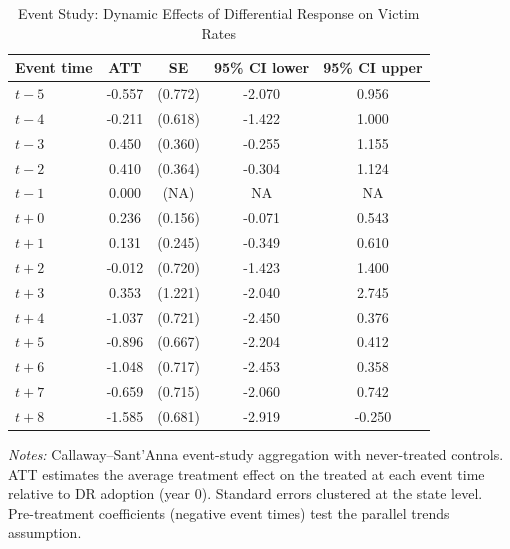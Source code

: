 \begin{table}[htbp]
\centering
\begin{threeparttable}
\caption{Event Study: Dynamic Effects of Differential Response on Victim Rates}
\label{tab:event_study}
\small
\begin{tabular}{lcccc}
\toprule
Event time & ATT & SE & 95\% CI lower & 95\% CI upper \\
\midrule
$t-5$ & -0.557 & (0.772) & -2.070 & 0.956 \\
$t-4$ & -0.211 & (0.618) & -1.422 & 1.000 \\
$t-3$ & 0.450 & (0.360) & -0.255 & 1.155 \\
$t-2$ & 0.410 & (0.364) & -0.304 & 1.124 \\
$t-1$ & 0.000 & (NA) & NA & NA \\
$t+0$ & 0.236 & (0.156) & -0.071 & 0.543 \\
$t+1$ & 0.131 & (0.245) & -0.349 & 0.610 \\
$t+2$ & -0.012 & (0.720) & -1.423 & 1.400 \\
$t+3$ & 0.353 & (1.221) & -2.040 & 2.745 \\
$t+4$ & -1.037 & (0.721) & -2.450 & 0.376 \\
$t+5$ & -0.896 & (0.667) & -2.204 & 0.412 \\
$t+6$ & -1.048 & (0.717) & -2.453 & 0.358 \\
$t+7$ & -0.659 & (0.715) & -2.060 & 0.742 \\
$t+8$ & -1.585 & (0.681) & -2.919 & -0.250 \\
\bottomrule
\end{tabular}
\begin{tablenotes}
\item \textit{Notes:} Callaway--Sant'Anna event-study aggregation with never-treated controls. ATT estimates the average treatment effect on the treated at each event time relative to DR adoption (year 0). Standard errors clustered at the state level. Pre-treatment coefficients (negative event times) test the parallel trends assumption.
\end{tablenotes}
\end{threeparttable}
\end{table}
